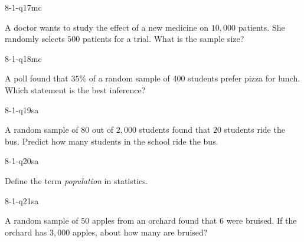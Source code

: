 \begin{practiceQuestion}{8-1-q17}{mc}
\begin{questionText}
A doctor wants to study the effect of a new medicine on $10{,}000$ patients. She randomly selects $500$ patients for a trial. What is the sample size?
\end{questionText}
\end{practiceQuestion}

\begin{practiceQuestion}{8-1-q18}{mc}
\begin{questionText}
A poll found that $35\%$ of a random sample of $400$ students prefer pizza for lunch. Which statement is the best inference?
\end{questionText}
\end{practiceQuestion}


\begin{practiceQuestion}{8-1-q19}{sa}
\begin{questionText}
A random sample of $80$ out of $2{,}000$ students found that $20$ students ride the bus. Predict how many students in the school ride the bus.
\end{questionText}
\end{practiceQuestion}

\begin{practiceQuestion}{8-1-q20}{sa}
\begin{questionText}
Define the term \emph{population} in statistics.
\end{questionText}
\end{practiceQuestion}

\begin{practiceQuestion}{8-1-q21}{sa}
\begin{questionText}
A random sample of $50$ apples from an orchard found that $6$ were bruised. If the orchard has $3{,}000$ apples, about how many are bruised?
\end{questionText}
\end{practiceQuestion}

